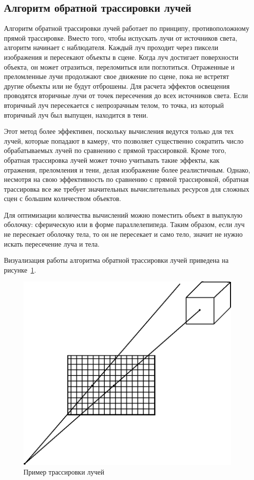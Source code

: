 \subsection{Алгоритм обратной трассировки лучей}
Алгоритм обратной трассировки лучей работает по принципу, противоположному прямой трассировке. Вместо того, чтобы испускать лучи от источников света, алгоритм начинает с наблюдателя. Каждый луч проходит через пиксели изображения и пересекают объекты в сцене. Когда луч достигает поверхности объекта, он может отразиться, переломиться или поглотиться. Отраженные и преломленные лучи продолжают свое движение по сцене, пока не встретят другие объекты или не будут отброшены. Для расчета эффектов освещения проводятся вторичные лучи от точек пересечения до всех источников света. Если вторичный луч пересекается с непрозрачным телом, то точка, из который вторичный луч был выпущен, находится в тени. 

Этот метод более эффективен, поскольку вычисления ведутся только для тех лучей, которые попадают в камеру, что позволяет существенно сократить число обрабатываемых лучей по сравнению с прямой трассировкой. Кроме того, обратная трассировка лучей может точно учитывать такие эффекты, как отражения, преломления и тени, делая изображение более реалистичным. Однако, несмотря на свою эффективность по сравнению с прямой трассировкой, обратная трассировка все же требует значительных вычислительных ресурсов для сложных сцен с большим количеством объектов.

Для оптимизации количества вычислений можно поместить объект в выпуклую оболочку: сферическую или в форме параллелепипеда. Таким образом, если луч не пересекает оболочку тела, то он не пересекает и само тело, значит не нужно искать пересечение луча и тела.

Визуализация работы алгоритма обратной трассировки лучей приведена на рисунке~\ref{fig:raytrassing}.

\begin{figure}[H]
	\centering
	\includegraphics[scale=0.6]{img/raytrassing.eps}
	\caption{Пример трассировки лучей}
	\label{fig:raytrassing}
\end{figure}

